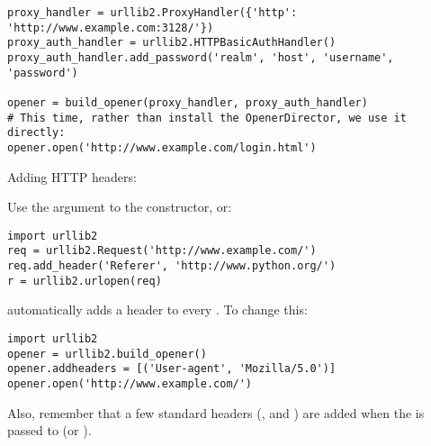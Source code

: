 \begin{verbatim}
proxy_handler = urllib2.ProxyHandler({'http': 'http://www.example.com:3128/'})
proxy_auth_handler = urllib2.HTTPBasicAuthHandler()
proxy_auth_handler.add_password('realm', 'host', 'username', 'password')

opener = build_opener(proxy_handler, proxy_auth_handler)
# This time, rather than install the OpenerDirector, we use it directly:
opener.open('http://www.example.com/login.html')
\end{verbatim}


Adding HTTP headers:

Use the  argument to the  constructor, or:

\begin{verbatim}
import urllib2
req = urllib2.Request('http://www.example.com/')
req.add_header('Referer', 'http://www.python.org/')
r = urllib2.urlopen(req)
\end{verbatim}

 automatically adds a 
header to every .  To change this:

\begin{verbatim}
import urllib2
opener = urllib2.build_opener()
opener.addheaders = [('User-agent', 'Mozilla/5.0')]
opener.open('http://www.example.com/')
\end{verbatim}

Also, remember that a few standard headers
(,  and
) are added when the  is passed to
 (or ).
